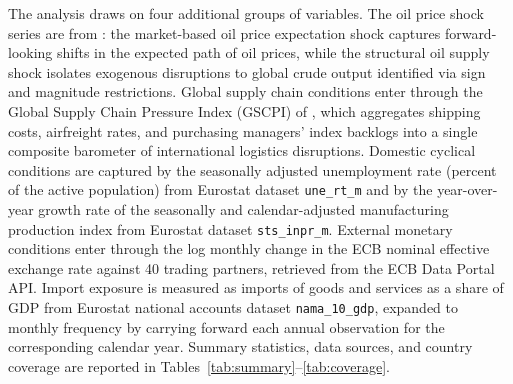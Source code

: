 The analysis draws on four additional groups of variables.
The oil price shock series are from \citet{baumeister2019}: the market-based oil price
expectation shock captures forward-looking shifts in the expected path of oil prices, while the
structural oil supply shock isolates exogenous disruptions to global crude output identified
via sign and magnitude restrictions.
Global supply chain conditions enter through the Global Supply Chain Pressure Index (GSCPI)
of \citet{benigno2022}, which aggregates shipping costs, airfreight rates, and purchasing
managers' index backlogs into a single composite barometer of international logistics
disruptions.
Domestic cyclical conditions are captured by the seasonally adjusted unemployment rate
(percent of the active population) from Eurostat dataset \texttt{une\_rt\_m} and by the
year-over-year growth rate of the seasonally and calendar-adjusted manufacturing
production index from Eurostat dataset \texttt{sts\_inpr\_m}.
External monetary conditions enter through the log monthly change in the ECB nominal
effective exchange rate against 40 trading partners, retrieved from the ECB Data Portal API.
Import exposure is measured as imports of goods and services as a share of GDP from
Eurostat national accounts dataset \texttt{nama\_10\_gdp}, expanded to monthly frequency
by carrying forward each annual observation for the corresponding calendar year.
Summary statistics, data sources, and country coverage are reported in
Tables~\ref{tab:summary}--\ref{tab:coverage}.




